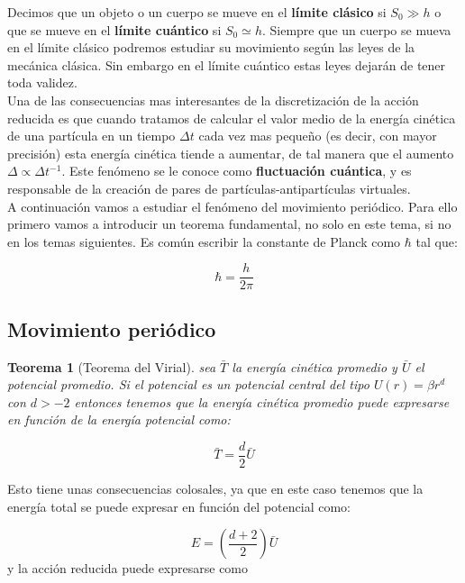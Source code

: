 \documentclass[12pt]{article}
\newcommand{\parentesis}[1]{\left( #1  \right)}
\newtheorem{theorem}{Teorema}[section]
\begin{document}
Decimos que un objeto o un cuerpo se mueve en el \textbf{límite clásico} si $S_0 \gg h$ o que se mueve en el \textbf{límite cuántico} si $S_0 \simeq h$. Siempre que un cuerpo se mueva en el límite clásico podremos estudiar su movimiento según las leyes de la mecánica clásica. Sin embargo en el límite cuántico estas leyes dejarán de tener toda validez. \\

Una de las consecuencias mas interesantes de la discretización de la acción reducida es que cuando tratamos de calcular el valor medio de la energía cinética de una partícula en un tiempo $\Delta t$ cada vez mas pequeño (es decir, con mayor precisión) esta energía cinética tiende a aumentar, de tal manera que el aumento $\Delta \varpropto \Delta t^{-1}$. Este fenómeno se le conoce como \textbf{fluctuación cuántica}, y es responsable de la creación de pares de partículas-antipartículas virtuales. \\

A continuación vamos a estudiar el fenómeno del movimiento periódico. Para ello primero vamos a introducir un teorema fundamental, no solo en este tema, si no en los temas siguientes. Es común escribir la constante de Planck como $\hbar$ tal que:

\begin{equation}
\hbar = \dfrac{h}{2 \pi}
\end{equation}

\subsection{Movimiento periódico}

\begin{theorem}[Teorema del Virial]
sea  $\bar{T}$ la energía cinética promedio y $\bar{U}$ el potencial promedio. Si el potencial es un potencial central del tipo $U(r) =  \beta r^d$ con $d>-2$ entonces tenemos que la energía cinética promedio puede expresarse en función de la energía potencial como:

\begin{equation}
\bar{T} = \dfrac{d}{2} \bar{U}
\end{equation}
\end{theorem}

Esto tiene unas consecuencias colosales, ya que en este caso tenemos que la energía total se puede expresar en función del potencial como:

\begin{equation}
E = \parentesis{\dfrac{d+2}{2}} \bar{U}
\end{equation}
y la acción reducida puede expresarse como
\end{document}
